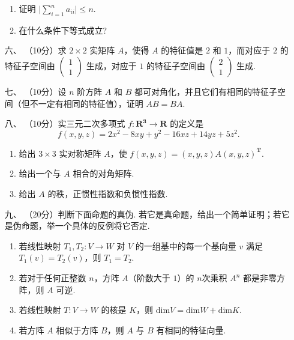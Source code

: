 \begin{enumerate}
    \begin{enumerate}[label=(\arabic*)]
        \item 证明 $\lvert\sum\limits_{i=1}^n{a_{ii}}\rvert \leq n$.
        \item 在什么条件下等式成立?
    \end{enumerate}
    \item [六、]（10分）求 $2\times 2$ 实矩阵 $A$，使得 $A$ 的特征值是 $2$ 和 $1$，而对应于 $2$ 的特征子空间由 $\begin{pmatrix}1 \\ 1\end{pmatrix}$
    生成，对应于 $1$ 的特征子空间由 $\begin{pmatrix}2 \\ 1\end{pmatrix}$ 生成.
    \item [七、]（10分）设 $n$ 阶方阵 $A$ 和 $B$ 都可对角化，并且它们有相同的特征子空间（但不一定有相同的特征值），证明 $AB=BA.$
    \item [八、]（10分）实三元二次多项式 $f:\mathbf{R^3}\to \mathbf{R}$ 的定义是
    \[f(x,y,z) = 2x^2-8xy+y^2-16xz+14yz+5z^2.\]
    \begin{enumerate}[label=(\arabic*)]
        \item 给出 $3\times 3$ 实对称矩阵 $A$，使 $f(x,y,z) = (x,y,z)A(x,y,z)^{\mathbf{T}}.$
        \item 给出一个与 $A$ 相合的对角矩阵.
        \item 给出 $A$ 的秩，正惯性指数和负惯性指数.
    \end{enumerate}
    \item [九、]（20分）判断下面命题的真伪. 若它是真命题，给出一个简单证明；若它是伪命题，举一个具体的反例将它否定.
    \begin{enumerate}[label=(\arabic*)]
        \item 若线性映射 $T_1,T_2:V \to W$ 对 $V$ 的一组基中的每一个基向量 $v$ 满足 $T_1(v)=T_2(v)$，则 $T_1=T_2.$
        \item 若对于任何正整数 $n$，方阵 $A$（阶数大于 $1$）的 $n$次乘积 $A^n$ 都是非零方阵，则 $A$ 可逆.
        \item 若线性映射 $T:V\to W$ 的核是 $K$，则 $\mathrm{dim}V=\mathrm{dim}W+\mathrm{dim}K.$
        \item 若方阵 $A$ 相似于方阵 $B$，则 $A$ 与 $B$ 有相同的特征向量.
    \end{enumerate}
\end{enumerate}

\newpage
